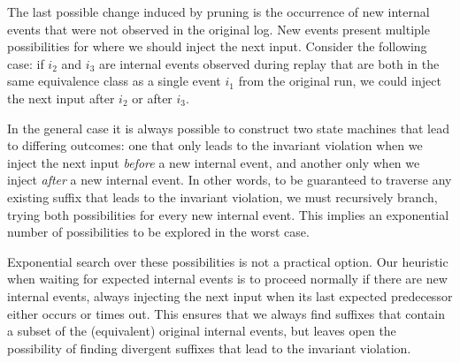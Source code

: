  The last possible change induced by pruning is the occurrence of new
internal events that were not observed in the original log.
New events present multiple possibilities for where
we should inject the next input. Consider the following case:
if $i_2$ and $i_3$ are internal events observed
during replay that are both in the same equivalence class as a single event $i_1$ from the
original run, we could inject the next input after $i_2$ or after $i_3$.


In the general case it is always possible to construct two state machines that lead
to differing outcomes: one that only leads to the invariant violation when
we inject the next input
\emph{before} a new internal event, and another only when we inject \emph{after} a new internal
event. In other words, to be guaranteed to traverse any existing suffix that leads
to the invariant violation, we must recursively branch, trying both
possibilities for every new internal event. This implies an exponential number of
possibilities to be explored in the worst case.

Exponential search over these possibilities is not a practical option. Our heuristic when waiting for expected internal
events is to proceed normally if there are new internal events,
always injecting the next input when its last expected predecessor
either occurs or times out. This ensures that we always find suffixes that
contain a subset of the (equivalent) original internal events, but leaves open the
possibility of finding divergent suffixes that lead to the invariant
violation.


